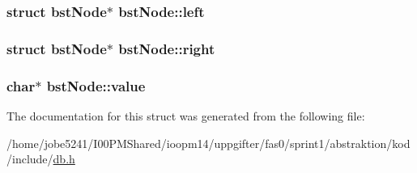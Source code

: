 \hypertarget{structbstNode_b9886f8c7058240f62de8a34e6adb41a}{
\subsubsection[{left}]{\setlength{\rightskip}{0pt plus 5cm}struct {\bf bstNode}$\ast$ {\bf bstNode::left}}}
\label{structbstNode_b9886f8c7058240f62de8a34e6adb41a}


\hypertarget{structbstNode_08982f9d00879a4b1f392972c3663f58}{
\subsubsection[{right}]{\setlength{\rightskip}{0pt plus 5cm}struct {\bf bstNode}$\ast$ {\bf bstNode::right}}}
\label{structbstNode_08982f9d00879a4b1f392972c3663f58}


\hypertarget{structbstNode_c775df568f03e0b1274a81912f90867c}{
\subsubsection[{value}]{\setlength{\rightskip}{0pt plus 5cm}char$\ast$ {\bf bstNode::value}}}
\label{structbstNode_c775df568f03e0b1274a81912f90867c}




The documentation for this struct was generated from the following file:\begin{CompactItemize}
\item 
/home/jobe5241/I00PMShared/ioopm14/uppgifter/fas0/sprint1/abstraktion/kod/include/\hyperlink{db_8h}{db.h}\end{CompactItemize}
